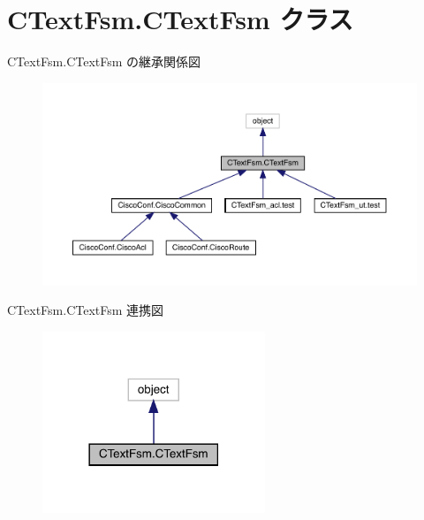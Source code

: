 \hypertarget{classCTextFsm_1_1CTextFsm}{}\section{C\+Text\+Fsm.\+C\+Text\+Fsm クラス}
\label{classCTextFsm_1_1CTextFsm}


C\+Text\+Fsm.\+C\+Text\+Fsm の継承関係図
\nopagebreak
\begin{figure}[H]
\begin{center}
\leavevmode
\includegraphics[width=350pt]{classCTextFsm_1_1CTextFsm__inherit__graph}
\end{center}
\end{figure}


C\+Text\+Fsm.\+C\+Text\+Fsm 連携図
\nopagebreak
\begin{figure}[H]
\begin{center}
\leavevmode
\includegraphics[width=189pt]{classCTextFsm_1_1CTextFsm__coll__graph}
\end{center}
\end{figure}

